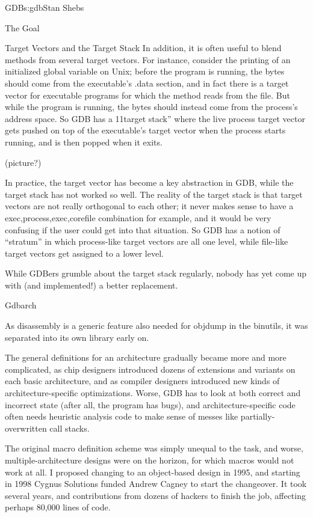 \begin{aosachapter}{GDB}{s:gdb}{Stan Shebs}
\begin{aosasect1}{The Goal}
\begin{aosasect1}{Target Vectors and the Target Stack}
In addition, it is often useful to blend methods from several target
vectors.  For instance, consider the printing of an initialized global
variable on Unix; before the program is running, the bytes should come
from the executable's .data section, and in fact there is a target
vector for executable programs for which the method reads from the
file.  But while the program is running, the bytes should instead come
from the process's address space.  So GDB has a 11target stack'' where
the live process target vector gets pushed on top of the executable's
target vector when the process starts running, and is then popped when
it exits.

(picture?)

In practice, the target vector has become a key abstraction in GDB,
while the target stack has not worked so well.  The reality of the
target stack is that target vectors are not really orthogonal to each
other; it never makes sense to have a exec,process,exec,corefile
combination for example, and it would be very confusing if the user
could get into that situation.  So GDB has a notion of ``stratum'' in
which process-like target vectors are all one level, while file-like
target vectors get assigned to a lower level.

While GDBers grumble about the target stack regularly, nobody has yet
come up with (and implemented!) a better replacement.

\end{aosasect1}

\begin{aosasect1}{Gdbarch}

As disassembly is a generic feature also needed for objdump in the
binutils, it was separated into its own library early on.

The general definitions for an architecture gradually became more and
more complicated, as chip designers introduced dozens of extensions
and variants on each basic architecture, and as compiler designers
introduced new kinds of architecture-specific optimizations.  Worse,
GDB has to look at both correct and incorrect state (after all, the
program has bugs), and architecture-specific code often needs
heuristic analysis code to make sense of messes like
partially-overwritten call stacks.

The original macro definition scheme was simply unequal to the task,
and worse, multiple-architecture designs were on the horizon, for
which macros would not work at all.  I proposed changing to an
object-based design in 1995, and starting in 1998 Cygnus Solutions
funded Andrew Cagney to start the changeover.  It took several years,
and contributions from dozens of hackers to finish the job, affecting
perhaps 80,000 lines of code.


\end{aosasect1}
\end{aosasect1}
\end{aosachapter}
